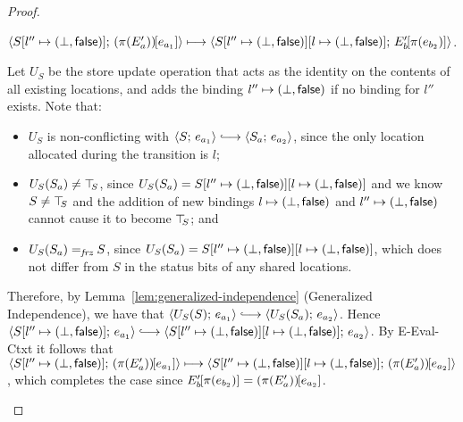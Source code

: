 \begin{proof}
\begin{enumerate}
\begin{enumerate}
\begin{itemize}
          $\langle S[l'' \mapsto (\bot, \textsf{false})];\, (\pi(E'_a))\hspace{-1mm}\left[e_{a_1}\right] \rangle
          \longmapsto
          \langle S[l'' \mapsto (\bot, \textsf{false})][l \mapsto (\bot, \textsf{false})];\, E'_b\hspace{-1mm}\left[\pi(e_{b_2})\right] \rangle$.

          Let $U_S$ be the store update operation that acts as the
          identity on the contents of all existing locations, and adds
          the binding $l'' \mapsto (\bot, \textsf{false})$ if no
          binding for $l''$ exists.  Note that:
          \begin{itemize}
          \item $U_S$ is non-conflicting with $\config{S}{e_{a_1}}
            \parstepsto \config{S_a}{e_{a_2}}$, since the only
            location allocated during the transition is $l$;
          \item $U_S(S_a) \neq \top\hspace{-0.85mm}_{S}$, since $U_S(S_a) =
            S[l'' \mapsto (\bot, \textsf{false})][l \mapsto (\bot, \textsf{false})]$
            and we know $S \neq \top\hspace{-0.85mm}_{S}$ and the addition of new
            bindings $l \mapsto (\bot, \textsf{false})$ and
            $l'' \mapsto (\bot, \textsf{false})$ cannot cause it
            to become $\top\hspace{-0.85mm}_{S}$; and
          \item $U_S(S_a) =_{\textit{frz}} S$, since $U_S(S_a) =
            S[l'' \mapsto (\bot, \textsf{false})][l \mapsto (\bot, \textsf{false})]$,
            which does not differ from $S$ in the status bits of any
            shared locations.
          \end{itemize}

          Therefore, by Lemma~\ref{lem:generalized-independence}
          (Generalized Independence), we have that
          $\config{U_S(S)}{e_{a_1}} \parstepsto
          \config{U_S(S_a)}{e_{a_2}}$.  Hence
          $\config{\extS{S}{l''}{\bot}{\frozenfalse}}{e_{a_1}}
          \parstepsto
          \config{\extS{\extS{S}{l''}{\bot}{\frozenfalse}}{l}{\bot}{\frozenfalse}}{e_{a_2}}$.
          By {\sc E-Eval-Ctxt} it follows that
          $\langle S[l'' \mapsto (\bot, \textsf{false})];\, (\pi(E'_a))\hspace{-1mm}\left[e_{a_1}\right] \rangle
          \longmapsto
          \langle S[l'' \mapsto (\bot, \textsf{false})][l \mapsto (\bot, \textsf{false})];\, (\pi(E'_a))\hspace{-1mm}\left[e_{a_2}\right] \rangle$,
          which completes the case since
          $E'_b\hspace{-1mm}\left[\pi(e_{b_2})\right] =
          (\pi(E'_a))\hspace{-1mm}\left[e_{a_2}\right]$.



\end{itemize}
\end{enumerate}
\end{enumerate}
\end{proof}
